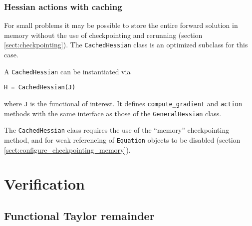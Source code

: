 \documentclass[11pt]{article}
\begin{document}
\subsubsection{Hessian actions with caching}

For small problems it may be possible to store the entire forward solution in
memory without the use of checkpointing and rerunning (section
\ref{sect:checkpointing}). The \texttt{CachedHessian} class is an optimized
subclass for this case.

A \texttt{CachedHessian} can be instantiated via
\begin{lstlisting}
H = CachedHessian(J)
\end{lstlisting}
where \texttt{J} is the functional of interest. It defines
\texttt{compute\_gradient} and \texttt{action} methods with the same interface
as those of the \texttt{GeneralHessian} class.

The \texttt{CachedHessian} class requires the use of the ``memory''
checkpointing method, and for weak referencing of \texttt{Equation} objects to
be disabled (section \ref{sect:configure_checkpointing_memory}).

\section{Verification}\label{sect:verification}

\subsection{Functional Taylor remainder}
\end{document}
